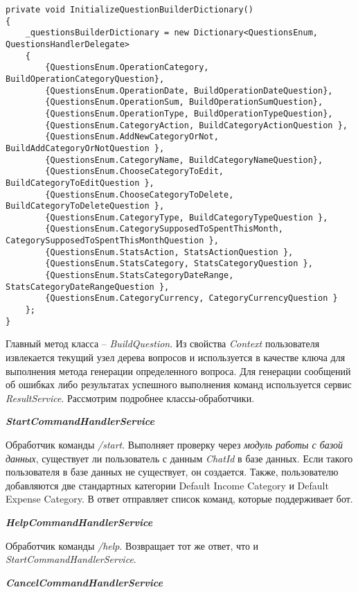 \lstset{style=sharpc}
\begin{lstlisting}
private void InitializeQuestionBuilderDictionary()
{
	_questionsBuilderDictionary = new Dictionary<QuestionsEnum, QuestionsHandlerDelegate>
	{
		{QuestionsEnum.OperationCategory, BuildOperationCategoryQuestion},
		{QuestionsEnum.OperationDate, BuildOperationDateQuestion},
		{QuestionsEnum.OperationSum, BuildOperationSumQuestion},
		{QuestionsEnum.OperationType, BuildOperationTypeQuestion},
		{QuestionsEnum.CategoryAction, BuildCategoryActionQuestion },
		{QuestionsEnum.AddNewCategoryOrNot, BuildAddCategoryOrNotQuestion },
		{QuestionsEnum.CategoryName, BuildCategoryNameQuestion},
		{QuestionsEnum.ChooseCategoryToEdit, BuildCategoryToEditQuestion },
		{QuestionsEnum.ChooseCategoryToDelete, BuildCategoryToDeleteQuestion },
		{QuestionsEnum.CategoryType, BuildCategoryTypeQuestion },
		{QuestionsEnum.CategorySupposedToSpentThisMonth, CategorySupposedToSpentThisMonthQuestion },
		{QuestionsEnum.StatsAction, StatsActionQuestion },
		{QuestionsEnum.StatsCategory, StatsCategoryQuestion },
		{QuestionsEnum.StatsCategoryDateRange, StatsCategoryDateRangeQuestion },
		{QuestionsEnum.CategoryCurrency, CategoryCurrencyQuestion }
	};
}
\end{lstlisting}

Главный метод класса – \emph{BuildQuestion}. Из свойства \emph{Context} пользователя извлекается текущий узел дерева вопросов и используется в качестве ключа для выполнения метода генерации определенного вопроса.
Для генерации сообщений об ошибках либо результатах успешного выполнения команд используется сервис \emph{ResultService}.
Рассмотрим подробнее классы-обработчики.

\textbf{\emph{StartCommandHandlerService}}

Обработчик команды \emph{/start}. Выполняет проверку через \emph{модуль работы с базой данных}, существует ли пользователь с данным \emph{ChatId} в базе данных. Если такого пользователя в базе данных не существует, он создается. Также, пользователю добавляются две стандартных категории Default Income Category и Default Expense Category. В ответ отправляет список команд, которые поддерживает бот.

\textbf{\emph{HelpCommandHandlerService}}

Обработчик команды \emph{/help}. Возвращает тот же ответ, что и \linebreak \emph{StartCommandHandlerService}.

\textbf{\emph{CancelCommandHandlerService}}

